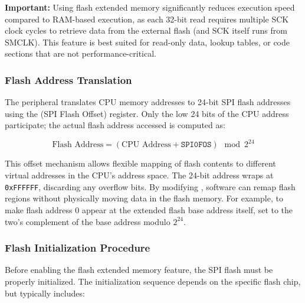 \textbf{Important:} Using flash extended memory significantly reduces execution speed compared to RAM-based execution, as each 32-bit read requires multiple SCK clock cycles to retrieve data from the external flash (and SCK itself runs from SMCLK). This feature is best suited for read-only data, lookup tables, or code sections that are not performance-critical.

\subsubsection{Flash Address Translation}

The  peripheral translates CPU memory addresses to 24-bit SPI flash addresses using the  (SPI Flash Offset) register. Only the low 24 bits of the CPU address participate; the actual flash address accessed is computed as:

\begin{equation*}
\text{Flash Address} = (\text{CPU Address} + \texttt{SPI0FOS}) \mod 2^{24}
\end{equation*}

This offset mechanism allows flexible mapping of flash contents to different virtual addresses in the CPU's address space. The 24-bit address wraps at \texttt{0xFFFFFF}, discarding any overflow bits. By modifying , software can remap flash regions without physically moving data in the flash memory. For example, to make flash address 0 appear at the extended flash base address itself, set  to the two's complement of the base address modulo $2^{24}$.

\subsubsection{Flash Initialization Procedure}

Before enabling the flash extended memory feature, the SPI flash must be properly initialized. The initialization sequence depends on the specific flash chip, but typically includes:

